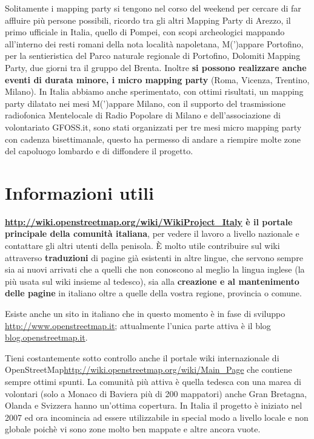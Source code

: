 \documentclass[a4paper,twoside,12pt,]{article}
\newcommand{\osm}{OpenStreetMap\xspace}
\begin{document}
Solitamente i mapping party si tengono nel corso del weekend per cercare di far affluire più persone possibili, ricordo tra gli altri Mapping Party di Arezzo, il primo ufficiale in Italia, quello di Pompei, con scopi archeologici mappando all'interno dei resti romani della nota località napoletana, M(')appare Portofino, per la sentieristica del Parco naturale regionale di Portofino, Dolomiti Mapping Party, due giorni tra il gruppo del Brenta.
Inoltre \textbf{si possono realizzare anche eventi di durata minore, i micro mapping party} (Roma, Vicenza, Trentino, Milano). In Italia abbiamo anche sperimentato, con ottimi risultati, un mapping party dilatato nei mesi M(')appare Milano, con il supporto del trasmissione radiofonica Mentelocale di Radio Popolare di Milano e dell'associazione di volontariato GFOSS.it, sono stati organizzati per tre mesi micro mapping party con cadenza bisettimanale, questo ha permesso di andare a riempire molte zone del capoluogo lombardo e di diffondere il progetto.
\section{Informazioni utili}
\textbf{\url{http://wiki.openstreetmap.org/wiki/WikiProject_Italy} è il portale principale della comunità italiana}, per vedere il lavoro a livello nazionale e contattare gli altri utenti della penisola. È molto utile contribuire sul wiki attraverso \textbf{traduzioni} di pagine già esistenti in altre lingue, che servono sempre sia ai nuovi arrivati che a quelli che non conoscono al meglio la lingua inglese (la più usata sul wiki insieme al tedesco), sia alla \textbf{creazione e al mantenimento delle pagine} in italiano oltre a quelle della vostra regione, provincia o comune.

Esiste anche un sito in italiano che in questo momento è in fase di sviluppo \url{http://www.openstreetmap.it}; attualmente l'unica parte attiva è il blog \url{blog.openstreetmap.it}.

Tieni costantemente sotto controllo anche il portale wiki internazionale di \osm \url{http://wiki.openstreetmap.org/wiki/Main_Page} che contiene sempre ottimi spunti.  La comunità più attiva è quella tedesca con una marea di volontari (solo a Monaco di Baviera più di 200 mappatori) anche Gran Bretagna, Olanda e Svizzera hanno un'ottima copertura. In Italia il progetto è iniziato nel 2007 ed ora incomincia ad essere utilizzabile in special modo a livello locale e non globale poichè vi sono zone molto ben mappate e altre ancora vuote.
\end{document}

